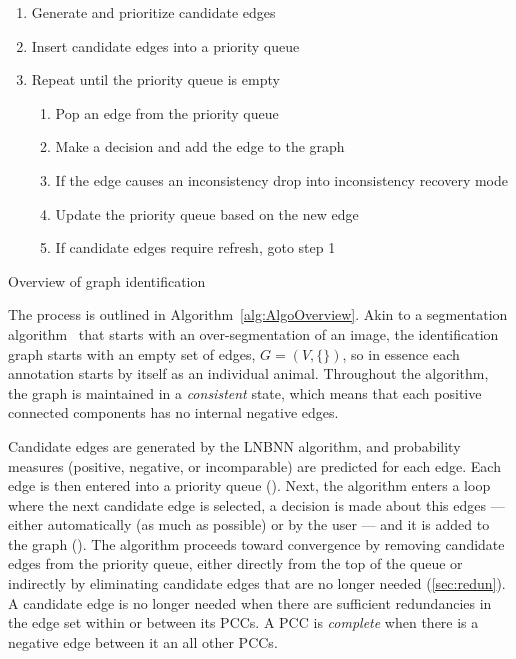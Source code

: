 \begin{algorithm}
    \begin{enumerate}
    \item Generate and prioritize candidate edges 
    \item Insert candidate edges into a priority queue 
    \item Repeat until the priority queue is empty
    \begin{enumerate}
        \item Pop an edge from the priority queue
        \item Make a decision and add the edge to the graph
        \item If the edge causes an inconsistency drop into inconsistency recovery mode
        \item Update the priority queue based on the new edge
        \item If candidate edges require refresh, goto step 1
    \end{enumerate}
    \end{enumerate}
\caption[Algorithm Overview]{Overview of graph identification}
\label{alg:AlgoOverview}
\end{algorithm}


The process is outlined in Algorithm~\ref{alg:AlgoOverview}.
Akin to a segmentation algorithm~\cite{fulkerson_class_2009} that starts with
  an over-segmentation of an image, the identification graph starts with an
  empty set of edges, %
$G = (V, \{ \})$, so in essence each annotation starts by itself as an
  individual animal.
Throughout the algorithm, the graph is maintained in a \emph{consistent}
  state, which means that each positive connected components has no internal
  negative edges.
 
Candidate edges are generated by the LNBNN algorithm, and probability measures
  (positive, negative, or incomparable) are predicted for each edge.
Each edge is then entered into a priority queue ().
Next, the algorithm enters a loop where the next candidate edge is selected, a
  decision is made about this edges --- either automatically (as much as
  possible) or by the user --- and it is added to the graph
  ().
The algorithm proceeds toward convergence by removing candidate edges from the
  priority queue, either directly from the top of the queue or indirectly by
  eliminating candidate edges that are no longer needed (\cref{sec:redun}).
A candidate edge is no longer needed when there are sufficient redundancies in
  the edge set within or between its PCCs.
A PCC is \emph{complete} when there is a negative edge between it an all other
  PCCs.

